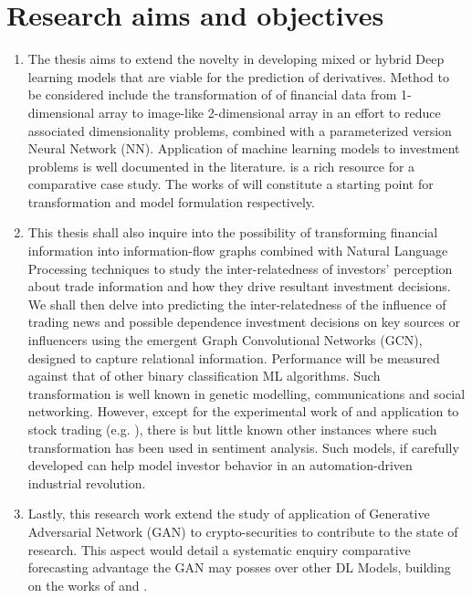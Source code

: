 \documentclass[a4paper,11pt]{scrartcl}
\begin{document}
\section{Research aims and objectives}
\begin{enumerate}
    \item The thesis aims to extend the novelty in developing mixed or hybrid Deep learning models that are viable for the prediction of derivatives. Method to be considered include the transformation of of financial data from 1-dimensional array to image-like 2-dimensional array in an effort to reduce associated dimensionality problems, combined with a parameterized version Neural Network (NN). Application of machine learning models to investment problems is well documented in the literature. \cite{ozbayoglu2020deep} is a rich resource for a comparative case study. The works of \cite{culkin2017machine, sezer2020financial} will constitute a starting point for transformation and model formulation respectively. \label{obj_1}
    \item This thesis shall also inquire into the possibility of transforming financial information into information-flow graphs combined with Natural Language Processing techniques to study the inter-relatedness of investors' perception about trade information and how they drive resultant investment decisions. We shall then delve into predicting the inter-relatedness of the influence of trading news and possible dependence investment decisions on key sources or influencers using the emergent  Graph Convolutional Networks (GCN), designed to capture relational information. Performance will be  measured against that of other binary classification ML algorithms.
    Such transformation is well known in genetic modelling, communications and social networking. However, except for the experimental work of  \cite{weber2019anti} and application to stock trading (e.g. \cite{chen2018incorporating,wang2019alphastock}), there is but little known other instances where such transformation has been used in sentiment analysis. Such models, if carefully developed can help model investor behavior in an automation-driven industrial revolution. \label{obj_2}
    \item Lastly, this research work extend the study of application of Generative Adversarial Network (GAN) to crypto-securities to contribute to the state of research. This aspect would detail a systematic enquiry comparative forecasting advantage the GAN may posses over other DL Models, building on the works of \cite{zola2020generative} and \cite{grilli2020generative}. \label{obj_3}
\end{enumerate}
\end{document}
